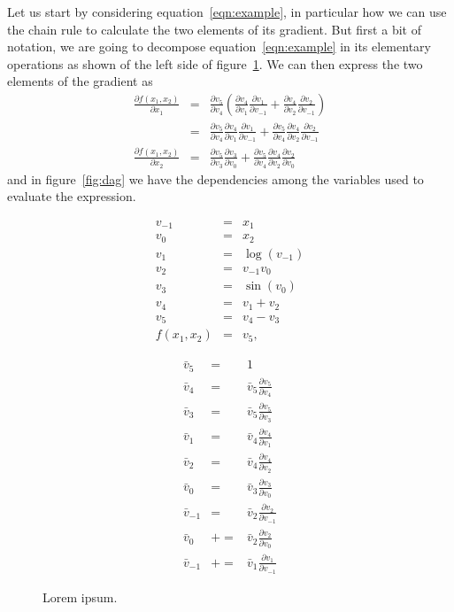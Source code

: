 \documentclass{article}
\newcommand{\partialfrac}[2]{\frac{\partial #1}{\partial #2}}
\newcommand{\pluseq}{\mathrel{{+}{=}}}
\begin{document}
Let us start by considering equation~\ref{eqn:example}, in particular how we can
use the chain rule to calculate the two elements of its gradient. But first a
bit of notation, we are going to decompose equation~\ref{eqn:example} in its
elementary operations as shown of the left side of figure~\ref{fig:example}.
We can then express the two elements of the gradient as
\begin{eqnarray*}
\partialfrac{f(x_1,x_2)}{x_1}
&=& \partialfrac{v_5}{v_4}\left(\partialfrac{v_4}{v_1}\partialfrac{v_1}{v_{-1}}
	+ \partialfrac{v_4}{v_2}\partialfrac{v_2}{v_{-1}}\right) \\
&=& \partialfrac{v_5}{v_4}\partialfrac{v_4}{v_1}\partialfrac{v_1}{v_{-1}}
	+ \partialfrac{v_5}{v_4}\partialfrac{v_4}{v_2}\partialfrac{v_2}{v_{-1}} \\
\partialfrac{f(x_1,x_2)}{x_2}
&=& \partialfrac{v_5}{v_3}\partialfrac{v_3}{v_0}
	+ \partialfrac{v_5}{v_4}\partialfrac{v_4}{v_2}\partialfrac{v_2}{v_0}
\end{eqnarray*}
and in figure~\ref{fig:dag} we have the dependencies among the variables used
to evaluate the expression.

\begin{figure}
\begin{minipage}{.5\textwidth}
\begin{eqnarray*}
v_{-1} &=& x_1 \\
v_0 &=& x_2 \\
v_1 &=& \log(v_{-1}) \\
v_2 &=& v_{-1}v_0 \\
v_3 &=& \sin(v_0) \\
v_4 &=& v_1+v_2 \\
v_5 &=& v_4-v_3 \\
f(x_1,x_2) &=& v_5,
\end{eqnarray*}
\end{minipage}
\begin{minipage}{.5\textwidth}
\renewcommand{\partialfrac}[2]{\textstyle\frac{\partial#1}{\partial#2}}
\begin{eqnarray*}
\bar v_5 &=& 1 \\
\bar v_4 &=& \bar v_5 \partialfrac{v_5}{v_4} \\
\bar v_3 &=& \bar v_5 \partialfrac{v_5}{v_3} \\
\bar v_1 &=& \bar v_4 \partialfrac{v_4}{v_1} \\
\bar v_2 &=& \bar v_4 \partialfrac{v_4}{v_2} \\
\bar v_0 &=& \bar v_3 \partialfrac{v_3}{v_0} \\
\bar v_{-1} &=& \bar v_2 \partialfrac{v_2}{v_{-1}} \\
\bar v_0 &\pluseq& \bar v_2 \partialfrac{v_2}{v_0} \\
\bar v_{-1} &\pluseq& \bar v_1 \partialfrac{v_1}{v_{-1}}
\end{eqnarray*}
\end{minipage}
\label{fig:example}
\caption{Lorem ipsum.}
\end{figure}
\end{document}
